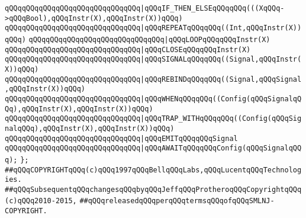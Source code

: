 \verb|qQQqqQQqqQQqqQQqqQQqqQQqqQQqqQQq|\verb#|qQQqIF_THEN_ELSEqQQqqQQq(((XqQQq->qQQqBool),qQQqInstr(X),qQQqInstr(X))qQQq)#\newline
\verb|qQQqqQQqqQQqqQQqqQQqqQQqqQQqqQQq|\verb#|qQQqREPEATqQQqqQQq((Int,qQQqInstr(X))qQQq)#\newline
\verb|qQQqqQQqqQQqqQQqqQQqqQQqqQQqqQQq|\verb#|qQQqLOOPqQQqqQQqInstr(X)#\newline
\verb|qQQqqQQqqQQqqQQqqQQqqQQqqQQqqQQq|\verb#|qQQqCLOSEqQQqqQQqInstr(X)#\newline
\verb|qQQqqQQqqQQqqQQqqQQqqQQqqQQqqQQq|\verb#|qQQqSIGNALqQQqqQQq((Signal,qQQqInstr(X))qQQq)#\newline
\verb|qQQqqQQqqQQqqQQqqQQqqQQqqQQqqQQq|\verb#|qQQqREBINDqQQqqQQq((Signal,qQQqSignal,qQQqInstr(X))qQQq)#\newline
\verb|qQQqqQQqqQQqqQQqqQQqqQQqqQQqqQQq|\verb#|qQQqWHENqQQqqQQq((Config(qQQqSignalqQQq),qQQqInstr(X),qQQqInstr(X))qQQq)#\newline
\verb|qQQqqQQqqQQqqQQqqQQqqQQqqQQqqQQq|\verb#|qQQqTRAP_WITHqQQqqQQq((Config(qQQqSignalqQQq),qQQqInstr(X),qQQqInstr(X))qQQq)#\newline
\verb|qQQqqQQqqQQqqQQqqQQqqQQqqQQqqQQq|\verb#|qQQqEMITqQQqqQQqSignal#\newline
\verb|qQQqqQQqqQQqqQQqqQQqqQQqqQQqqQQq|\verb#|qQQqAWAITqQQqqQQqConfig(qQQqSignalqQQq);#\newline
\newline
\verb|};|\newline
\newline
\newline
\verb|##qQQqCOPYRIGHTqQQq(c)qQQq1997qQQqBellqQQqLabs,qQQqLucentqQQqTechnologies.|\newline
\verb|##qQQqSubsequentqQQqchangesqQQqbyqQQqJeffqQQqProtheroqQQqCopyrightqQQq(c)qQQq2010-2015,|\newline
\verb|##qQQqreleasedqQQqperqQQqtermsqQQqofqQQqSMLNJ-COPYRIGHT.|\newline

